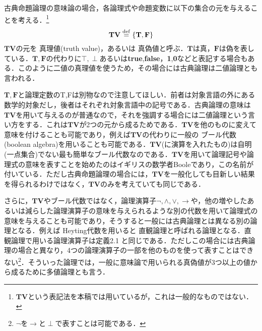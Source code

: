 \documentclass{ltjsarticle}
\theoremstyle{mystyle1}
\theoremstyle{mystyle3}
\theoremstyle{mystyle2}
\newcommand{\bT}{\ensuremath{\mathbf{T}}}
\newcommand{\bF}{\ensuremath{\mathbf{F}}}
\newcommand{\bV}{\ensuremath{\mathbf{V}}}
\newcommand{\dequal}{\ensuremath{\stackrel{\rm{def}}{=}}}
\newcommand{\red}[1]{{\color{red} #1}}
\begin{document}
古典命題論理の意味論の場合，各論理式や命題変数に以下の集合の元を与えることを考える．\footnote{$\bT\bV$という表記法を本稿では用いているが，これは一般的なものではない．}
\[\bT\bV\dequal\{\bT,\bF\}\]
$\bT\bV$の元を\red{真理値}(truth value)，あるいは\red{真偽値}と呼ぶ．$\bT$は真，$\bF$は偽を表している．$\bT,\bF$の代わりに$\top,\perp$あるいは\textbf{true},\textbf{false}，\textbf{1},\textbf{0}などと表記する場合もある．このように二値の真理値を使うため，その場合には古典論理は二値論理とも言われる．

$\bT,\bF$と論理定数のT,Fは別物なので注意してほしい．前者は対象言語の外にある数学的対象だし，後者はそれぞれ対象言語中の記号である．古典論理の意味は$\bT\bV$を用いて与えるのが普通なので，それを強調する場合には二値論理という言い方をする．これは$\bT\bV$が2つの元から成るためである．$\bT\bV$を他のものに変えて意味を付けることも可能であり，例えば$\bT\bV$の代わりに一般の\red{ブール代数}(boolean algebra)を用いることも可能である．$\bT\bV$(に演算を入れたもの)は自明(一点集合)でない最も簡単なブール代数なのである．$\bT\bV$を用いて論理記号や論理式の意味を表すことを始めたのはイギリスの数学者Booleであり，この名前が付いている．ただし古典命題論理の場合には，$\bT\bV$を一般化しても目新しい結果を得られるわけではなく，$\bT\bV$のみを考えていても同じである．

さらに，$\bT\bV$やブール代数ではなく，論理演算子$\neg,\wedge,\vee,\to$や，他の増やしたあるいは減らした論理演算子の意味を与えられるような別の代数を用いて論理式の意味を与えることも可能であり，そうすると一般には古典論理とは異なる別の論理となる．例えば\red{Heyting代数}を用いると\red{直観論理}と呼ばれる論理となる．直観論理で用いる論理演算子は定義2.1 と同じである．ただしこの場合には古典論理の場合と異なり，4つの論理演算子の一部を他のものを使って表すことはできない\footnote{$\neg$を$\to$と$\perp$で表すことは可能である．}．そういった論理では，一般に意味論で用いられる真偽値が3つ以上の値から成るために多値論理とも言う．
\end{document}
